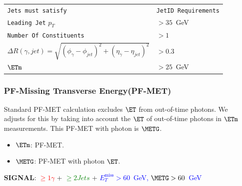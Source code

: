 \documentclass{beamer}
\begin{document}
\begin{frame}
\begin{minipage}[b]{0.45\linewidth}
{\begin{tabular}[2cm]{l l}
  \hline 
  \hline
 \texttt{Jets must satisfy} & \texttt{JetID Requirements} \\
 \texttt{Leading Jet} $p_{T}$ & $ > 35$~GeV \\
 \texttt{Number Of Constituents} & $ > 1$ \\
 $\Delta R(\gamma, jet) = \sqrt{(\phi_{\gamma}-\phi_{jet})^{2} + (\eta_{\gamma}-\eta_{jet})^{2}}$ & $ > 0.3$ \\
\hline \hline
 $\ETm$&  $> 25$~GeV \\
 \hline
\end{tabular}
}
  \end{minipage}
\end{frame}


\begin{frame}
\frametitle{PF-Missing Transverse Energy(PF-MET)}

\begin{tcolorbox}[colback=UNL@Cream!5,colframe=UMN@Maroon!40,title=\textcolor{UMN@Maroon}{\textbf{PF-Missing Transverse Energy($\ETm$)}}]
Standard PF-MET calculation excludes $\ET$ from out-of-time photons.
We adjusts for this by taking into account the $\ET$ of out-of-time photons in $\ETm$ measurements. This  PF-MET with photon is \textcolor{blue}{ $\METG$}.
  \begin{itemize}
    \item $\mathbf{\ETm}$: PF-MET.
    \item $\mathbf{\METG}$: PF-MET with photon $\ET$.
  \end{itemize}
\end{tcolorbox}

  \begin{tcolorbox}[colback=UNL@Cream!5,colframe=UMN@Maroon!40,title=\textcolor{UMN@Maroon}{\textbf{Signal Selection Criteria}}]
\textcolor{UMN@Maroon}{\textbf{SIGNAL}}: \textcolor{red}{$\geq 1 \gamma$}  + \textcolor{green}{$\geq 2 Jets$} + \textcolor{blue}{$E^{\mbox{miss}}_{T} > 60$~GeV, $\METG > 60$~GeV}
   \end{tcolorbox}
\end{frame}
\end{document}
